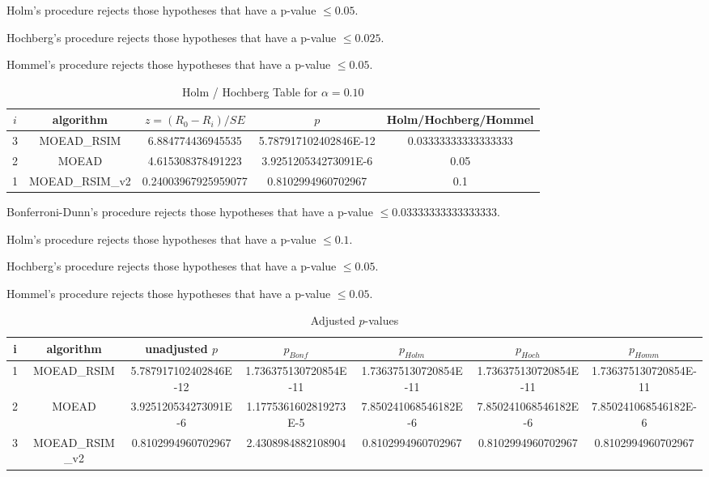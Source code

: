 \documentclass[a4paper,10pt]{article}
\begin{document}
\begin{landscape}
Holm's procedure rejects those hypotheses that have a p-value $\le0.05$.


Hochberg's procedure rejects those hypotheses that have a p-value $\le0.025$.


Hommel's procedure rejects those hypotheses that have a p-value $\le0.05$.


\begin{table}[!htp]
\centering\tiny
\caption{Holm / Hochberg Table for $\alpha=0.10$}
\begin{tabular}{ccccc}
$i$&algorithm&$z=(R_0 - R_i)/SE$&$p$&Holm/Hochberg/Hommel\\
\hline
3&MOEAD_RSIM&6.884774436945535&5.787917102402846E-12&0.03333333333333333\\
2&MOEAD&4.615308378491223&3.925120534273091E-6&0.05\\
1&MOEAD_RSIM_v2&0.24003967925959077&0.8102994960702967&0.1\\
\hline
\end{tabular}
\end{table}
Bonferroni-Dunn's procedure rejects those hypotheses that have a p-value $\le0.03333333333333333$.


Holm's procedure rejects those hypotheses that have a p-value $\le0.1$.


Hochberg's procedure rejects those hypotheses that have a p-value $\le0.05$.


Hommel's procedure rejects those hypotheses that have a p-value $\le0.05$.


\begin{table}[!htp]
\centering\tiny
\caption{Adjusted $p$-values}
\begin{tabular}{ccccccc}
i&algorithm&unadjusted $p$&$p_{Bonf}$&$p_{Holm}$&$p_{Hoch}$&$p_{Homm}$\\
\hline
1&MOEAD_RSIM&5.787917102402846E-12&1.736375130720854E-11&1.736375130720854E-11&1.736375130720854E-11&1.736375130720854E-11\\
2&MOEAD&3.925120534273091E-6&1.1775361602819273E-5&7.850241068546182E-6&7.850241068546182E-6&7.850241068546182E-6\\
3&MOEAD_RSIM_v2&0.8102994960702967&2.4308984882108904&0.8102994960702967&0.8102994960702967&0.8102994960702967\\
\hline
\end{tabular}
\end{table}


\end{landscape}
\end{document}
